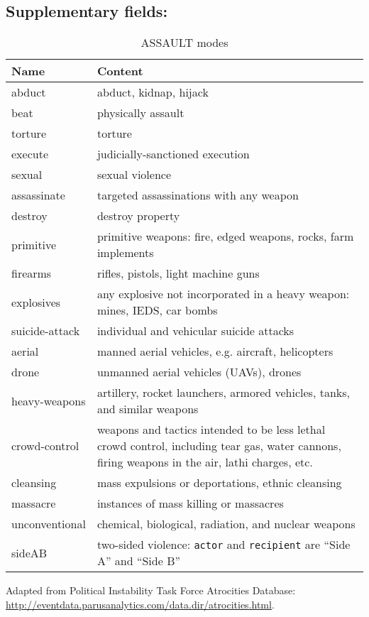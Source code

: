 \documentclass[11pt]{report}
\newcommand{\txt}[1]{\texttt{#1}}
\begin{document}

\subsection{Supplementary fields:}


\begin{table}[htp]
\caption{ASSAULT modes}
\begin{center}
\begin{tabular}{|p{}|p{}|}
\hline
Name & Content \\
\hline
abduct & abduct, kidnap, hijack \\
beat & physically assault \\
torture & torture \\
execute & judicially-sanctioned execution \\
sexual & sexual violence\\
assassinate & targeted assassinations with any weapon \\
destroy & destroy property \\
primitive & primitive weapons: fire, edged weapons, rocks, farm implements \\
firearms & rifles, pistols, light machine guns\\
explosives & any explosive not incorporated in a heavy weapon: mines, IEDS, car bombs \\
suicide-attack & individual and vehicular suicide attacks \\
aerial & manned aerial vehicles, e.g. aircraft, helicopters \\
drone & unmanned aerial vehicles (UAVs), drones \\
heavy-weapons & artillery, rocket launchers, armored vehicles, tanks, and similar weapons \\
crowd-control & weapons and tactics intended to be less lethal crowd control, including tear gas, water cannons, firing weapons in the air, lathi charges, etc. \\
cleansing & mass expulsions or deportations, ethnic cleansing  \\
massacre & instances of mass killing or massacres  \\
unconventional & chemical, biological, radiation, and nuclear weapons  \\
sideAB & two-sided violence: \txt{actor} and \txt{recipient} are ``Side A'' and ``Side B'' \\
\hline
\end{tabular}
\end{center}
\label{tab:violmode}
\raggedright{Adapted from Political Instability Task Force Atrocities Database: \url{http://eventdata.parusanalytics.com/data.dir/atrocities.html}}.
\end{table}%
\end{document}
